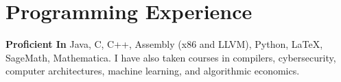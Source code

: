 \documentclass[11pt,letterpaper,sans]{moderncv}
\begin{document}
\section{Programming Experience}
\textbf{Proficient In} Java, C, C++, Assembly (x86 and LLVM), Python, \LaTeX, SageMath, Mathematica. I have also taken courses in compilers, cybersecurity, computer architectures, machine learning, and algorithmic economics.



  
\end{document}

